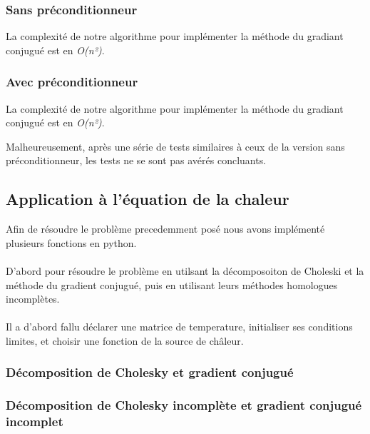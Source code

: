 \subsubsection{Sans préconditionneur}

La complexité de notre algorithme pour implémenter la méthode du gradiant conjugué est en \textit{O(n²)}.

\subsubsection{Avec préconditionneur}

La complexité de notre algorithme pour implémenter la méthode du gradiant conjugué est en \textit{O(n²)}.

Malheureusement, après une série de tests similaires à ceux de la version sans préconditionneur, les tests ne se sont pas avérés concluants.

\subsection{Application à l'équation de la chaleur}

Afin de résoudre le problème precedemment posé nous avons implémenté plusieurs fonctions en python.
\\
\\
D'abord pour résoudre le problème en utilsant la décomposoiton de Choleski et la méthode du gradient conjugué, puis en utilisant leurs méthodes homologues incomplètes.
\\
\\
Il a d'abord fallu déclarer une matrice de temperature, initialiser ses conditions limites, et choisir une fonction de la source de châleur.

\subsubsection{Décomposition de Cholesky et gradient conjugué}
\subsubsection{Décomposition de Cholesky incomplète et gradient conjugué incomplet}
